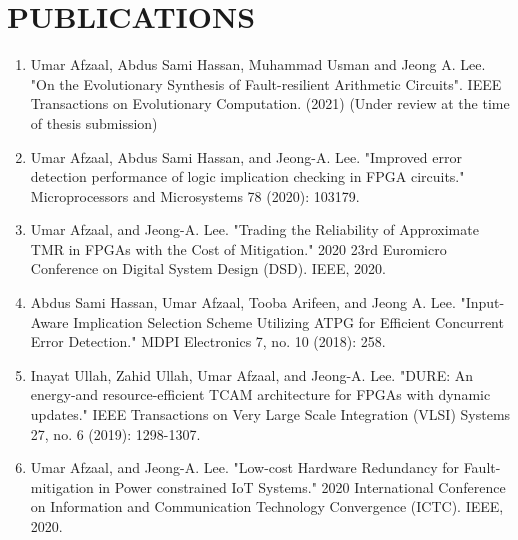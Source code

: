\newpage
\section*{PUBLICATIONS}

\begin{enumerate}

\item Umar Afzaal, Abdus Sami Hassan, Muhammad Usman and Jeong A. Lee. "On the Evolutionary Synthesis of Fault-resilient Arithmetic Circuits". IEEE Transactions on Evolutionary Computation. (2021) (Under review at the time of thesis submission)

\item Umar Afzaal, Abdus Sami Hassan, and Jeong-A. Lee. "Improved error detection performance of logic implication checking in FPGA circuits." Microprocessors and Microsystems 78 (2020): 103179.

\item Umar Afzaal, and Jeong-A. Lee. "Trading the Reliability of Approximate TMR in FPGAs with the Cost of Mitigation." 2020 23rd Euromicro Conference on Digital System Design (DSD). IEEE, 2020.

\item Abdus Sami Hassan, Umar Afzaal, Tooba Arifeen, and Jeong A. Lee. "Input-Aware Implication Selection Scheme Utilizing ATPG for Efficient Concurrent Error Detection." MDPI Electronics 7, no. 10 (2018): 258.

\item Inayat Ullah, Zahid Ullah, Umar Afzaal, and Jeong-A. Lee. "DURE: An energy-and resource-efficient TCAM architecture for FPGAs with dynamic updates." IEEE Transactions on Very Large Scale Integration (VLSI) Systems 27, no. 6 (2019): 1298-1307.


\item Umar Afzaal, and Jeong-A. Lee. "Low-cost Hardware Redundancy for Fault-mitigation in Power constrained IoT Systems." 2020 International Conference on Information and Communication Technology Convergence (ICTC). IEEE, 2020.

\end{enumerate}




\pagebreak  %


